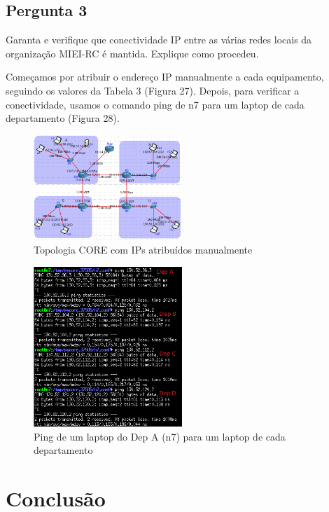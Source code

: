 \documentclass[11pt]{article}
\begin{document}
\clearpage
\subsection{Pergunta 3}

Garanta e verifique que conectividade IP entre as várias redes locais da organização MIEI-RC é mantida. Explique como procedeu.

\vspace{0.5cm}

Começamos por atribuir o endereço IP manualmente a cada equipamento, seguindo os valores da Tabela 3 (Figura 27). Depois, para verificar a conectividade, usamos o comando ping de n7 para um laptop de cada departamento (Figura 28).

\begin{figure}[!htb]
    \centering
    \includegraphics[width=0.5\textwidth]{images/parte3/core2.png}
    \caption{Topologia CORE com IPs atribuídos manualmente}
\end{figure}

\begin{figure}[!htb]
    \centering
    \includegraphics[width=0.5\textwidth]{images/parte3/pings_final.png}
    \caption{Ping de um laptop do Dep A (n7) para um laptop de cada departamento}
\end{figure}

\clearpage
\section{Conclusão}
\end{document}
